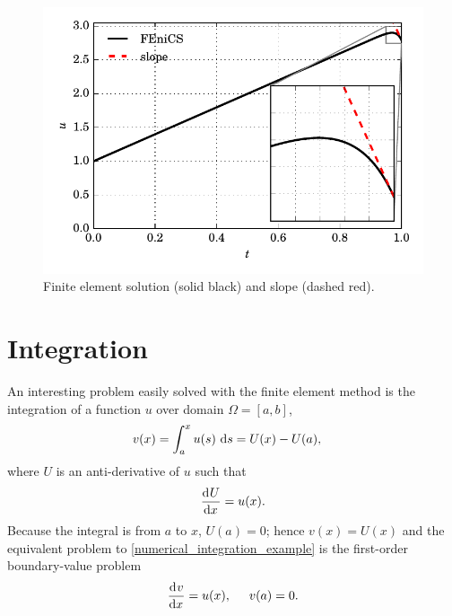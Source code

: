   \begin{figure}
    \centering
      \includegraphics[width=\linewidth]{images/fenics_intro/1D_BVP_2.pdf}
    \caption[BVP example one solution]{Finite element solution (solid black) and slope (dashed red).}
    \label{1d_bvp_2_image}
  \end{figure}


  \section{Integration} \label{ssn_integration}
  
  An interesting problem easily solved with the finite element method is the integration of a function $u$ over domain $\Omega = [a,b]$,
  \begin{align}
    \label{numerical_integration_example}
    v(x) &= \int_a^x u(s) \ \mathrm{d}s = U(x) - U(a),
  \end{align}
  where $U$ is an anti-derivative of $u$ such that
  \begin{align*}
    \frac{\mathrm{d}{^{}} U}{\mathrm{d} x{^{}} } = u(x).
  \end{align*}
  Because the integral is from $a$ to $x$, $U(a) = 0$; hence $v(x) = U(x)$ and the equivalent problem to \cref{numerical_integration_example} is the first-order boundary-value problem
  \begin{align}
    \label{1d_example_4}
    \frac{\mathrm{d}{^{}} v}{\mathrm{d} x{^{}} } = u(x), \hspace{5mm} v(a) = 0.
  \end{align}

